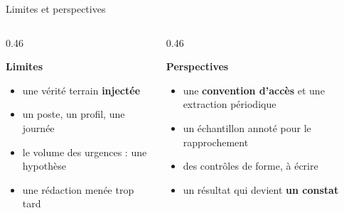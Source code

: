 \documentclass[aspectratio=169,11pt]{beamer}
\begin{document}
\begin{frame}{Limites et perspectives}
  \vspace{2mm}
  \begin{columns}[T]
    \begin{column}{0.46\textwidth}
      {\large\bfseries\color{griscartouche}Limites\par}
      \medskip
      \begin{itemize}\setlength{\itemsep}{2mm}
        \item une vérité terrain \textbf{injectée}
        \item un poste, un profil, une journée
        \item le volume des urgences : une hypothèse
        \item une rédaction menée trop tard
      \end{itemize}
    \end{column}
    \begin{column}{0.46\textwidth}
      {\large\bfseries\color{accentgarde}Perspectives\par}
      \medskip
      \begin{itemize}\setlength{\itemsep}{2mm}
        \item une \textbf{convention d'accès} et une extraction périodique
        \item un échantillon annoté pour le rapprochement
        \item des contrôles de forme, à écrire
        \item un résultat qui devient \textbf{un constat}
      \end{itemize}
    \end{column}
  \end{columns}
\end{frame}
\end{document}
